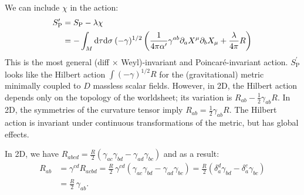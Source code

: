 We can include $\chi$ in the action: 
\begin{equation}
	\begin{aligned}
		S_{\mathrm{P}}^{\prime} &=S_{\mathrm{P}}-\lambda \chi \\
		&=-\int_{M} \mathrm{d} \tau \mathrm{d} \sigma\:(-\gamma)^{1 / 2}\left(\frac{1}{4 \pi \alpha^{\prime}} \gamma^{a b} \partial_{a} X^{\mu} \partial_{b} X_{\mu}+\frac{\lambda}{4 \pi} R\right)
	\end{aligned}
\end{equation}
This is the most general (diff $\times$ Weyl)-invariant and Poincaré-invariant action. 
$S_{\mathrm{P}}^\prime$ looks like the Hilbert action $\int (-\gamma)^{1/2}R$ for the (gravitational) metric minimally coupled to $D$ massless scalar fields. However, in 2D, the Hilbert action depends only on the topology of the worldsheet; its variation is $R_{ab}-\frac{1}{2}\gamma_{ab}R$. In 2D, the symmetries of the curvature tensor imply $R_{ab}=\frac{1}{2}\gamma_{ab}R$. The Hilbert action is invariant under continuous transformations of the metric, but has global effects. 
\begin{tcolorbox}
	\begin{remark}
		In 2D, we have $R_{abcd}= \frac{R}{2}\left(\gamma_{ac}\gamma_{bd} - \gamma_{ad}\gamma_{bc}\right)$ and as a result:
		\begin{align}
			R_{ab} &= \gamma^{cd} R_{acbd}= \frac{R}{2}\,\gamma^{cd}\left(\gamma_{ac}\gamma_{bd} - \gamma_{ad}\gamma_{bc}\right)= \frac{R}{2}\left(\delta^d_a \gamma_{bd} - \delta^c_a \gamma_{bc}\right) \nonumber\\[6pt]
			&= \frac{R}{2}\,\gamma_{ab}.
		\end{align} 
	\end{remark}
\end{tcolorbox}

